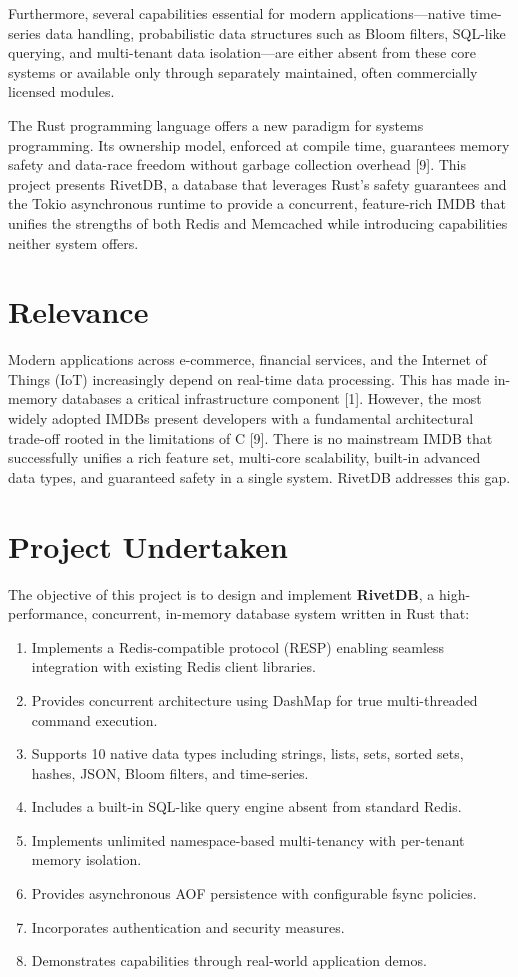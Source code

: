 \documentclass[12pt,a4paper]{report}
\begin{document}
Furthermore, several capabilities essential for modern applications---native time-series data handling, probabilistic data structures such as Bloom filters, SQL-like querying, and multi-tenant data isolation---are either absent from these core systems or available only through separately maintained, often commercially licensed modules.

The Rust programming language offers a new paradigm for systems programming. Its ownership model, enforced at compile time, guarantees memory safety and data-race freedom without garbage collection overhead [9]. This project presents RivetDB, a database that leverages Rust's safety guarantees and the Tokio asynchronous runtime to provide a concurrent, feature-rich IMDB that unifies the strengths of both Redis and Memcached while introducing capabilities neither system offers.

\section{Relevance}

Modern applications across e-commerce, financial services, and the Internet of Things (IoT) increasingly depend on real-time data processing. This has made in-memory databases a critical infrastructure component [1]. However, the most widely adopted IMDBs present developers with a fundamental architectural trade-off rooted in the limitations of C [9]. There is no mainstream IMDB that successfully unifies a rich feature set, multi-core scalability, built-in advanced data types, and guaranteed safety in a single system. RivetDB addresses this gap.

\section{Project Undertaken}

The objective of this project is to design and implement \textbf{RivetDB}, a high-performance, concurrent, in-memory database system written in Rust that:

\begin{enumerate}[leftmargin=2.5em]
    \item Implements a Redis-compatible protocol (RESP) enabling seamless integration with existing Redis client libraries.
    \item Provides concurrent architecture using DashMap for true multi-threaded command execution.
    \item Supports 10 native data types including strings, lists, sets, sorted sets, hashes, JSON, Bloom filters, and time-series.
    \item Includes a built-in SQL-like query engine absent from standard Redis.
    \item Implements unlimited namespace-based multi-tenancy with per-tenant memory isolation.
    \item Provides asynchronous AOF persistence with configurable fsync policies.
    \item Incorporates authentication and security measures.
    \item Demonstrates capabilities through real-world application demos.
\end{enumerate}
\end{document}

